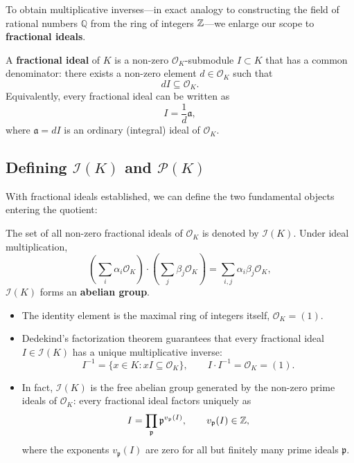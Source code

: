\documentclass[a4paper]{article}
\begin{document}
To obtain multiplicative inverses---in exact analogy to constructing the field of rational numbers $\mathbb{Q}$ from the ring of integers $\mathbb{Z}$---we enlarge our scope to \textbf{fractional ideals}.

\begin{definition}
A \textbf{fractional ideal} of $K$ is a non-zero $\mathcal{O}_K$-submodule $I \subset K$ that has a common denominator: there exists a non-zero element $d \in \mathcal{O}_K$ such that
\begin{equation}
 d I \subseteq \mathcal{O}_K.
\end{equation}
Equivalently, every fractional ideal can be written as
\begin{equation}
 I = \frac{1}{d} \mathfrak{a},
\end{equation}
where $\mathfrak{a} = dI$ is an ordinary (integral) ideal of $\mathcal{O}_K$.
\end{definition}

\subsection{Defining \texorpdfstring{$\mathcal{I}(K)$ and $\mathcal{P}(K)$}{I(K) and P(K)}}
With fractional ideals established, we can define the two fundamental objects entering the quotient:

\begin{definition}
The set of all non-zero fractional ideals of $\mathcal{O}_K$ is denoted by $\mathcal{I}(K)$. Under ideal multiplication,
\begin{equation}
 \left(\sum_i \alpha_i \mathcal{O}_K\right) \cdot \left(\sum_j \beta_j \mathcal{O}_K\right) = \sum_{i, j} \alpha_i \beta_j \mathcal{O}_K,
\end{equation}
$\mathcal{I}(K)$ forms an \textbf{abelian group}.
\begin{itemize}[leftmargin=2em]
 \item The identity element is the maximal ring of integers itself, $\mathcal{O}_K = (1)$.
 \item Dedekind's factorization theorem guarantees that every fractional ideal $I \in \mathcal{I}(K)$ has a unique multiplicative inverse:
 \begin{equation}
  I^{-1} = \{ x \in K : x I \subseteq \mathcal{O}_K \}, \qquad I \cdot I^{-1} = \mathcal{O}_K = (1).
 \end{equation}
 \item In fact, $\mathcal{I}(K)$ is the free abelian group generated by the non-zero prime ideals of $\mathcal{O}_K$: every fractional ideal factors uniquely as
 \begin{equation}
  I = \prod_{\mathfrak{p}} \mathfrak{p}^{v_{\mathfrak{p}}(I)}, \qquad v_{\mathfrak{p}}(I) \in \mathbb{Z},
 \end{equation}
 where the exponents $v_{\mathfrak{p}}(I)$ are zero for all but finitely many prime ideals $\mathfrak{p}$.
\end{itemize}
\end{definition}
\end{document}
